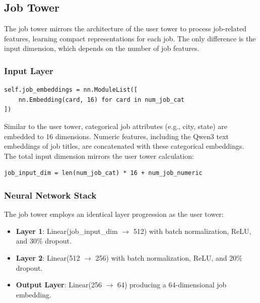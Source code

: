 \subsection{Job Tower}
\label{sec:job_tower}

The job tower mirrors the architecture of the user tower to process job-related features, learning compact representations for each job. The only difference is the input dimension, which depends on the number of job features.

\subsubsection{Input Layer}

\begin{listing}[H]
\begin{verbatim}
self.job_embeddings = nn.ModuleList([
    nn.Embedding(card, 16) for card in num_job_cat
])
\end{verbatim}
\caption{Job embedding layer initialization in the two-tower model}
\label{lst:job_embeddings}
\end{listing}

Similar to the user tower, categorical job attributes (e.g., city, state) are embedded to 16 dimensions. Numeric features, including the Qwen3 text embeddings of job titles, are concatenated with these categorical embeddings. The total input dimension mirrors the user tower calculation:

\begin{listing}[H]
\begin{verbatim}
job_input_dim = len(num_job_cat) * 16 + num_job_numeric
\end{verbatim}
\caption{Job input dimension calculation}
\label{lst:job_input_dim}
\end{listing}

\subsubsection{Neural Network Stack}

The job tower employs an identical layer progression as the user tower:
\begin{itemize}
    \item \textbf{Layer 1}: Linear(job\_input\_dim $\rightarrow$ 512) with batch normalization, ReLU, and 30\% dropout.
    \item \textbf{Layer 2}: Linear(512 $\rightarrow$ 256) with batch normalization, ReLU, and 20\% dropout.
    \item \textbf{Output Layer}: Linear(256 $\rightarrow$ 64) producing a 64-dimensional job embedding.
\end{itemize}

